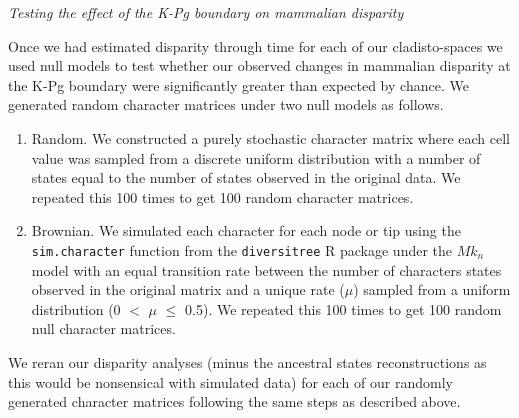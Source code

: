 \documentclass[12pt,letterpaper]{article}
\renewcommand{\subsection}[1]{%
\bigskip
\begin{center}
\begin{large}
\normalfont\itshape #1
\end{large}
\end{center}}
\begin{document}
\subsection{Testing the effect of the K-Pg boundary on mammalian disparity} %
Once we had estimated disparity through time for each of our cladisto-spaces we used null models to test whether our observed changes in mammalian disparity at the K-Pg boundary were significantly greater than expected by chance.
We generated random character matrices under two null models as follows.
  \begin{enumerate}
    \item Random. We constructed a purely stochastic character matrix where each cell value was sampled from a discrete uniform distribution with a number of states equal to the number of states observed %
    in the original data. We repeated this 100 times to get 100 random character matrices.
    \item Brownian. %
    We simulated each character for each node or tip using the \texttt{sim.character} function from the \texttt{diversitree} R package \citep{fitzjohndiversitree2012} under the $Mk_n$ model \citep{lewisa2001} with an equal transition rate between the number of characters states observed in the original matrix and a unique rate ($\mu$) sampled from a uniform distribution (0 $<$ $\mu$ $\leq$ 0.5). %
    We repeated this 100 times to get 100 random null character matrices. %
  \end{enumerate}
We reran our disparity analyses (minus the ancestral states reconstructions as this would be nonsensical with simulated data) for each of our randomly generated character matrices following the same steps as described above. %
\end{document}
